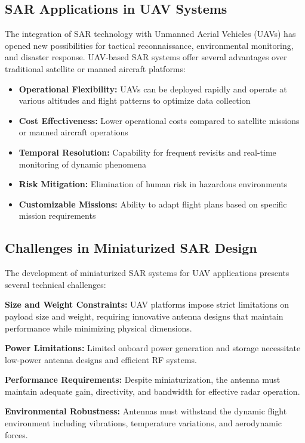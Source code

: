 \documentclass[12pt]{article}
\begin{document}
\subsection{SAR Applications in UAV Systems}

The integration of SAR technology with Unmanned Aerial Vehicles (UAVs) has opened new possibilities for tactical reconnaissance, environmental monitoring, and disaster response. UAV-based SAR systems offer several advantages over traditional satellite or manned aircraft platforms:

\begin{itemize}
    \item \textbf{Operational Flexibility:} UAVs can be deployed rapidly and operate at various altitudes and flight patterns to optimize data collection
    \item \textbf{Cost Effectiveness:} Lower operational costs compared to satellite missions or manned aircraft operations
    \item \textbf{Temporal Resolution:} Capability for frequent revisits and real-time monitoring of dynamic phenomena
    \item \textbf{Risk Mitigation:} Elimination of human risk in hazardous environments
    \item \textbf{Customizable Missions:} Ability to adapt flight plans based on specific mission requirements
\end{itemize}

\subsection{Challenges in Miniaturized SAR Design}

The development of miniaturized SAR systems for UAV applications presents several technical challenges:

\textbf{Size and Weight Constraints:} UAV platforms impose strict limitations on payload size and weight, requiring innovative antenna designs that maintain performance while minimizing physical dimensions.

\textbf{Power Limitations:} Limited onboard power generation and storage necessitate low-power antenna designs and efficient RF systems.

\textbf{Performance Requirements:} Despite miniaturization, the antenna must maintain adequate gain, directivity, and bandwidth for effective radar operation.

\textbf{Environmental Robustness:} Antennas must withstand the dynamic flight environment including vibrations, temperature variations, and aerodynamic forces.
\end{document}
